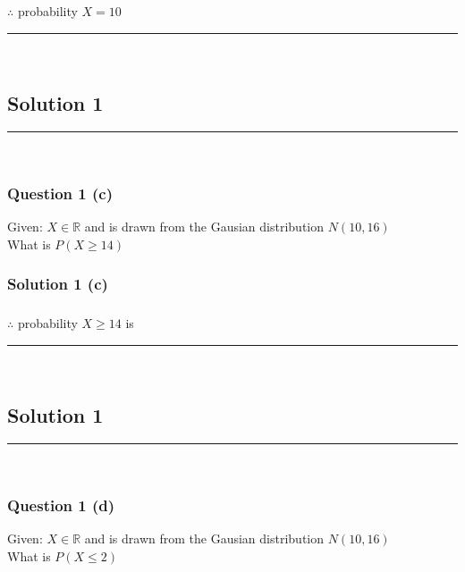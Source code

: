 \documentclass{article}
\begin{document}
\subsubsection*{\normalfont}{$\therefore$ probability $X = 10 $}\\

\noindent\rule{\textwidth}{0.4pt}\\

\newpage

\subsection*{Solution 1}
\noindent\rule{\textwidth}{0.4pt}\\
\subsubsection*{Question 1 (c)}
\begin{flushleft}
    Given: $X \in \mathbb{R}$ and is drawn from the Gausian distribution $N(10,16)$\\
    What is $P(X \geq 14)$
\end{flushleft}

\subsubsection*{Solution 1 (c)}


\subsubsection*{\normalfont}{$\therefore$ probability $X \geq 14 $ is}\\

\noindent\rule{\textwidth}{0.4pt}\\

\newpage

\subsection*{Solution 1}
\noindent\rule{\textwidth}{0.4pt}\\
\subsubsection*{Question 1 (d)}
\begin{flushleft}
    Given: $X \in \mathbb{R}$ and is drawn from the Gausian distribution $N(10,16)$\\
    What is $P(X \leq 2)$
\end{flushleft}
\end{document}
